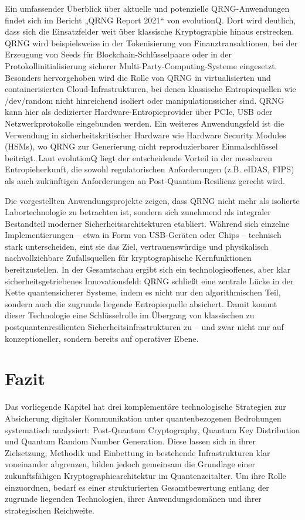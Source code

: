 Ein umfassender Überblick über aktuelle und potenzielle QRNG-Anwendungen findet sich im Bericht „QRNG Report 2021“ von evolutionQ. Dort wird deutlich, dass sich die Einsatzfelder weit über klassische Kryptographie hinaus erstrecken. QRNG wird beispielsweise in der Tokenisierung von Finanztransaktionen, bei der Erzeugung von Seeds für Blockchain-Schlüsselpaare oder in der Protokollinitialisierung sicherer Multi-Party-Computing-Systeme eingesetzt. Besonders hervorgehoben wird die Rolle von QRNG in virtualisierten und containerisierten Cloud-Infrastrukturen, bei denen klassische Entropiequellen wie /dev/random nicht hinreichend isoliert oder manipulationssicher sind. QRNG kann hier als dedizierter Hardware-Entropieprovider über PCIe, USB oder Netzwerkprotokolle eingebunden werden. Ein weiteres Anwendungsfeld ist die Verwendung in sicherheitskritischer Hardware wie Hardware Security Modules (HSMs), wo QRNG zur Generierung nicht reproduzierbarer Einmalschlüssel beiträgt. Laut evolutionQ liegt der entscheidende Vorteil in der messbaren Entropieherkunft, die sowohl regulatorischen Anforderungen (z.B. eIDAS, FIPS) als auch zukünftigen Anforderungen an Post-Quantum-Resilienz gerecht wird.


Die vorgestellten Anwendungsprojekte zeigen, dass QRNG nicht mehr als isolierte Labortechnologie zu betrachten ist, sondern sich zunehmend als integraler Bestandteil moderner Sicherheitsarchitekturen etabliert. Während sich einzelne Implementierungen – etwa in Form von USB-Geräten oder Chips – technisch stark unterscheiden, eint sie das Ziel, vertrauenswürdige und physikalisch nachvollziehbare Zufallsquellen für kryptographische Kernfunktionen bereitzustellen. In der Gesamtschau ergibt sich ein technologieoffenes, aber klar sicherheitsgetriebenes Innovationsfeld: QRNG schließt eine zentrale Lücke in der Kette quantensicherer Systeme, indem es nicht nur den algorithmischen Teil, sondern auch die zugrunde liegende Entropiequelle absichert. Damit kommt dieser Technologie eine Schlüsselrolle im Übergang von klassischen zu postquantenresilienten Sicherheitsinfrastrukturen zu – und zwar nicht nur auf konzeptioneller, sondern bereits auf operativer Ebene.

\section{Fazit}
Das vorliegende Kapitel hat drei komplementäre technologische Strategien zur Absicherung digitaler Kommunikation unter quantenbezogenen Bedrohungen systematisch analysiert: Post-Quantum Cryptography, Quantum Key Distribution und Quantum Random Number Generation. Diese lassen sich in ihrer Zielsetzung, Methodik und Einbettung in bestehende Infrastrukturen klar voneinander abgrenzen, bilden jedoch gemeinsam die Grundlage einer zukunftsfähigen Kryptographiearchitektur im Quantenzeitalter. Um ihre Rolle einzuordnen, bedarf es einer strukturierten Gesamtbewertung entlang der zugrunde liegenden Technologien, ihrer Anwendungsdomänen und ihrer strategischen Reichweite.

